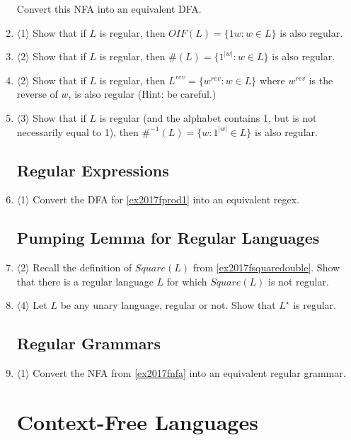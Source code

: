 \documentclass[]{article}
\newcommand{\Level}[1]{{\color{blue} $\langle$#1$\rangle$}}
\begin{document}
\begin{enumerate}
Convert this NFA into an equivalent DFA.

\item \Level{1} Show that if $L$ is regular, then $OIF(L) = \{1w : w \in L \}$ is also regular.

\item \Level{2} Show that if $L$ is regular, then $\#(L) = \{1^{|w|} : w \in L\}$ is also regular.

\item \Level{2} Show that if $L$ is regular, then $L^{rev} = \{w^{rev} : w \in L\}$ where $w^{rev}$ is the reverse of $w$, is also regular (Hint: be careful.)

\item \Level{3} Show that if $L$ is regular (and the alphabet contains 1, but is not necessarily equal to 1), then $\#^{-1}(L) = \{w : 1^{|w|} \in L\}$ is also regular.



\subsection{Regular Expressions}

\item \Level{1} Convert the DFA for \cref{ex2017fprod1} into an equivalent regex.

\subsection{Pumping Lemma for Regular Languages}

\item \Level{2} Recall the definition of $Square(L)$ from \cref{ex2017fsquaredouble}. 
Show that there is a regular language $L$ for which $Square(L)$ is not regular.

\item \Level{4} Let $L$ be any unary language, regular or not. Show that $L^\star$ is regular.

\subsection{Regular Grammars}

\item \Level{1} Convert the NFA from \cref{ex2017fnfa} into an equivalent regular grammar.

\section{Context-Free Languages}


\end{enumerate}
\end{document}
